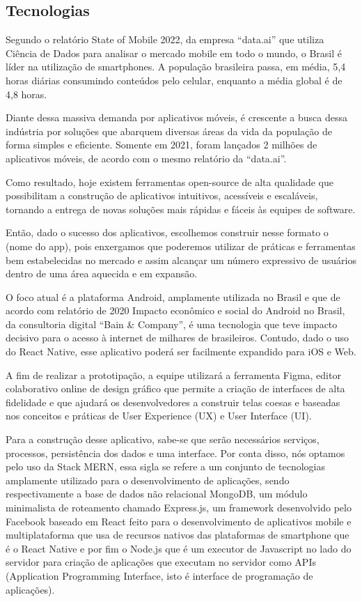 \begin{apendicesenv}
\section{Tecnologias}
Segundo o relatório State of Mobile 2022, da empresa “data.ai” que utiliza Ciência de Dados para analisar o mercado mobile em todo o mundo, o Brasil é líder na utilização de smartphones. A população brasileira passa, em média, 5,4 horas diárias consumindo conteúdos pelo celular, enquanto a média global é de 4,8 horas. 

Diante dessa massiva demanda por aplicativos móveis, é crescente a busca dessa indústria por soluções que abarquem diversas áreas da vida da população de forma simples e eficiente. Somente em 2021, foram lançados 2 milhões de aplicativos móveis, de acordo com o mesmo relatório da “data.ai”.

Como resultado, hoje existem ferramentas open-source de alta qualidade que possibilitam a construção de aplicativos intuitivos, acessíveis e escaláveis, tornando a entrega de novas soluções mais rápidas e fáceis às equipes de software. 

Então, dado o sucesso dos aplicativos, escolhemos construir nesse formato o (nome do app), pois enxergamos que poderemos utilizar de práticas e ferramentas bem estabelecidas no mercado e assim alcançar um número expressivo de usuários dentro de uma área aquecida e em expansão.

O foco atual é a plataforma Android, amplamente utilizada no Brasil e que de acordo com relatório de 2020 Impacto econômico e social do Android no Brasil, da consultoria digital “Bain & Company”, é uma tecnologia que teve impacto decisivo para o acesso à internet de milhares de brasileiros. Contudo, dado o uso do React Native, esse aplicativo poderá ser facilmente expandido para iOS e Web.

A fim de realizar a prototipação, a equipe utilizará a ferramenta Figma, editor colaborativo online de design gráfico que permite a criação de interfaces de alta fidelidade e que ajudará os desenvolvedores a construir telas coesas e baseadas nos conceitos e práticas de User Experience (UX) e User Interface (UI).

Para a construção desse aplicativo, sabe-se que serão necessários serviços, processos, persistência dos dados e uma interface. Por conta disso, nós optamos pelo uso da Stack MERN, essa sigla se refere a um conjunto de tecnologias amplamente utilizado para o desenvolvimento de aplicações, sendo respectivamente a base de dados não relacional MongoDB, um módulo minimalista de roteamento chamado Express.js, um framework desenvolvido pelo Facebook baseado em React feito para o desenvolvimento de aplicativos mobile e multiplataforma que usa de recursos nativos das plataformas de smartphone que é o React Native e por fim o Node.js que é um executor de Javascript no lado do servidor para criação de aplicações que executam no servidor como APIs (Application Programming Interface, isto é interface de programação de aplicações).


\end{apendicesenv}
